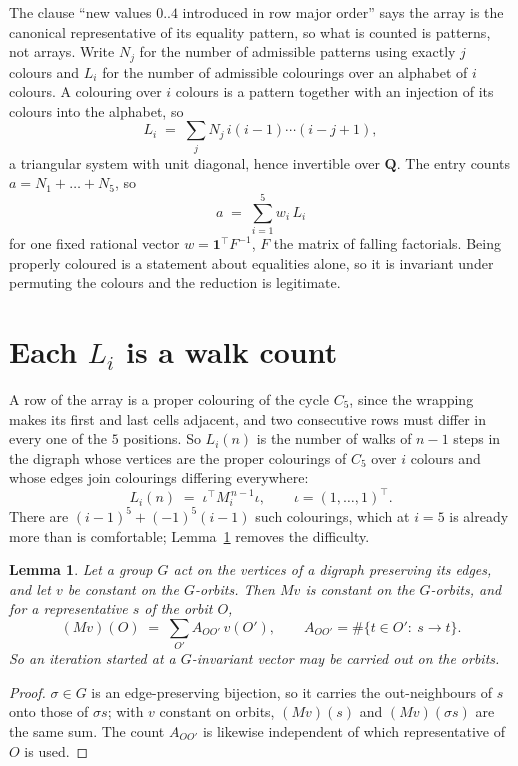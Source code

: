 \documentclass[11pt,a4paper]{article}
\theoremstyle{plain}
\newtheorem{lemma}[theorem]{Lemma}
\theoremstyle{definition}
\begin{document}
The clause ``new values $0..4$ introduced in row major order'' says the array is the
canonical representative of its equality pattern, so what is counted is patterns, not arrays.
Write $N_j$ for the number of admissible patterns using exactly $j$ colours and $L_i$ for the
number of admissible colourings over an alphabet of $i$ colours. A colouring over $i$ colours
is a pattern together with an injection of its colours into the alphabet, so
\[
L_i\;=\;\sum_j N_j\,i(i-1)\cdots(i-j+1),
\]
a triangular system with unit diagonal, hence invertible over $\mathbf{Q}$. The entry counts
$a=N_1+\dots+N_{5}$, so
\[
a\;=\;\sum_{i=1}^{5}w_i\,L_i
\]
for one fixed rational vector $w=\mathbf{1}^{\!\top}F^{-1}$, $F$ the matrix of falling
factorials. Being properly coloured is a statement about equalities alone, so it is invariant
under permuting the colours and the reduction is legitimate.

\section{Each $L_i$ is a walk count}

A row of the array is a proper colouring of the cycle $C_{5}$, since the wrapping makes
its first and last cells adjacent, and two consecutive rows must differ in every one of the
$5$ positions. So $L_i(n)$ is the number of walks of $n-1$ steps in the digraph whose
vertices are the proper colourings of $C_{5}$ over $i$ colours and whose edges join
colourings differing everywhere:
\[
L_i(n)\;=\;\iota^{\!\top}M_i^{\,n-1}\iota ,\qquad \iota=(1,\dots,1)^{\!\top} .
\]
There are $(i-1)^{5}+(-1)^{5}(i-1)$ such colourings, which at $i=5$ is already more
than is comfortable; Lemma~\ref{lem:lump} removes the difficulty.

\begin{lemma}\label{lem:lump}
Let a group $G$ act on the vertices of a digraph preserving its edges, and let $v$ be constant
on the $G$-orbits. Then $Mv$ is constant on the $G$-orbits, and for a representative $s$ of
the orbit $O$,
\[
(Mv)(O)\;=\;\sum_{O'}A_{OO'}\,v(O'),\qquad
A_{OO'}=\#\{t\in O':\ s\to t\} .
\]
So an iteration started at a $G$-invariant vector may be carried out on the orbits.
\end{lemma}

\begin{proof}
$\sigma\in G$ is an edge-preserving bijection, so it carries the out-neighbours of $s$ onto
those of $\sigma s$; with $v$ constant on orbits, $(Mv)(s)$ and $(Mv)(\sigma s)$ are the same
sum. The count $A_{OO'}$ is likewise independent of which representative of $O$ is used.
\end{proof}
\end{document}
